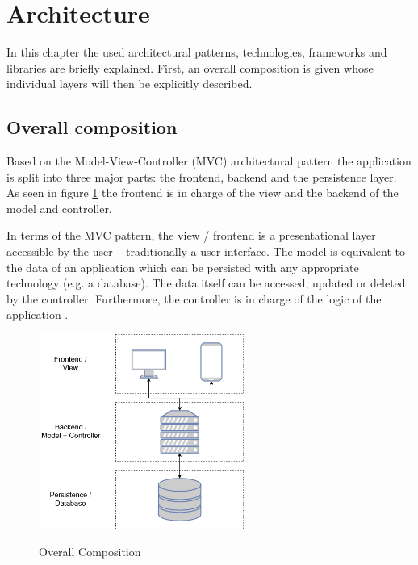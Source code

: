 
\section{Architecture}
\label{sec:DomainC}

In this chapter the used architectural patterns, technologies, frameworks and libraries are briefly explained. First, an overall composition is given whose individual layers will then be explicitly described.


\subsection{Overall composition}
\label{sec:DomainCa}
Based on the Model-View-Controller (\ac{MVC}) architectural pattern the application is split into three major parts: the frontend, backend and the persistence layer. As seen in figure \ref{fig:overallcomposition} the frontend is in charge of the view and the backend of the model and controller.

In terms of the \ac{MVC} pattern, the view / frontend is a presentational layer accessible by the user – traditionally a user interface. The model is equivalent to the data of an application which can be persisted with any appropriate technology (e.g. a database). The data itself can be accessed, updated or deleted by the controller. Furthermore, the controller is in charge of the logic of the application \cite[p. 7]{steyerWebanwendungenMitASP2017}.

\begin{figure}[H]
	\centering
	\includegraphics[width=0.6\textwidth]{Content/Domain/OverallComposition.png}
	\caption{Overall Composition}
	\cite{own representation}
	\label{fig:overallcomposition}
\end{figure}

